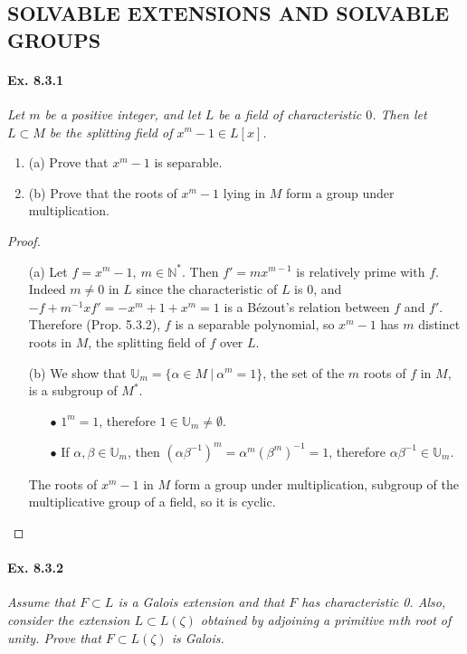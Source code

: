 \documentclass[11pt,a4paper]{article}
\newcommand{\be} {\begin{enumerate}}
\newcommand{\ee} {\end{enumerate}}
\newcommand{\N}{\mathbb{N}}
\begin{document}
\subsection{SOLVABLE EXTENSIONS AND SOLVABLE GROUPS}

\paragraph{Ex. 8.3.1}

{\it Let $m$ be a positive integer, and let $L$ be a field of characteristic $0$. Then let $L \subset M$ be the splitting field of $x^m-1\in L[x]$.
\be
\item[(a)] Prove that $x^m-1$ is separable.
\item[(b)] Prove that the roots of $x^m-1$ lying in $M$ form a group under multiplication.
\ee
}

\begin{proof}
\begin{enumerate}
\item[(a)]
Let $f=x^m-1,\ m\in \N^*$. Then $f'=m x^{m-1}$ is relatively prime with  $f$. Indeed $m\neq 0$ in $L$ since the characteristic of $L$ is $0$, and $-f +m^{-1} x f'= -x^m+1 + x^m = 1$ is a B\'ezout's relation between $f$ and $f'$. Therefore (Prop. 5.3.2), $f$ is a separable polynomial, so $x^m-1$ has $m$ distinct roots in $M$,  the splitting field of $f$ over $L$.

\item[(b)] We show that $\mathbb{U}_m = \{\alpha \in M\ \vert \ \alpha^m=1\}$, the set of the $m$ roots of $f$ in $M$, is a subgroup of $M^*$.
\be
\item[$\bullet$] $1^m = 1$, therefore $1\in \mathbb{U}_m \neq \emptyset$.

\item[$\bullet$] If $\alpha, \beta \in \mathbb{U}_m$, then $(\alpha \beta^{-1})^m = \alpha^m (\beta^m)^{-1} = 1$, therefore $\alpha \beta^{-1} \in \mathbb{U}_m$.
\ee
The roots of $x^m-1$ in $M$ form a group under multiplication, subgroup of the multiplicative group of a field, so it is cyclic.

\end{enumerate}
\end{proof}


\paragraph{Ex. 8.3.2}

{\it Assume that $F\subset L$ is a Galois extension and that $F$ has characteristic 0. Also, consider the extension $L \subset L(\zeta)$ obtained by adjoining a primitive $m$th root of unity. Prove that $F\subset L(\zeta)$ is Galois.
}
\end{document}
